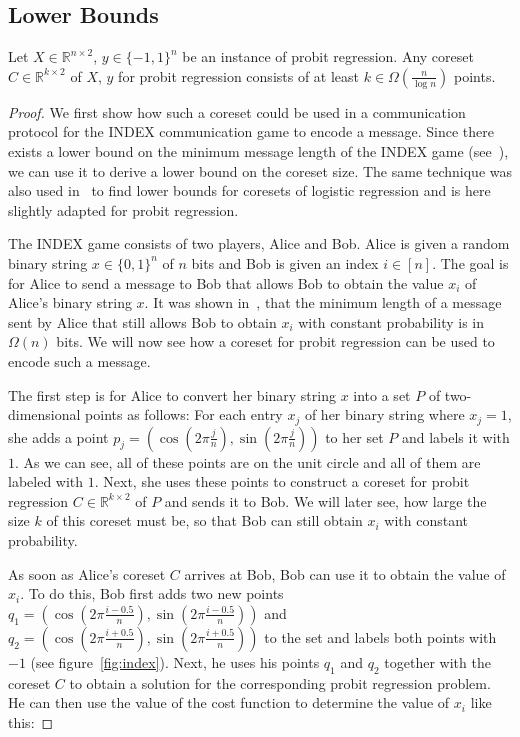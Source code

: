 \subsection{Lower Bounds}

\begin{theorem}
    Let $X \in \mathbb{R}^{n \times 2}$, $y \in \{-1, 1\}^n$ be
    an instance of probit regression.
    Any coreset $C \in \mathbb{R}^{k \times 2}$ of $X$, $y$
    for probit regression consists of
    at least $k \in \Omega\left(\frac{n}{\log{n}}\right)$ points.
\end{theorem}
\begin{proof}
    We first show how such a coreset could be used in a
    communication protocol for the INDEX communication game
    to encode a message.
    Since there exists a lower bound on the minimum
    message length of the INDEX game (see~\cite{index}),
    we can use it to derive a lower bound on the
    coreset size.
    The same technique was also used in~\cite{on-coresets} to find
    lower bounds for coresets of logistic regression and is here slightly
    adapted for probit regression.

    The INDEX game consists of two players, Alice and Bob.
    Alice is given a random binary string $x \in \{0, 1\}^n$ of $n$ bits
    and Bob is given an index $i \in [n]$.
    The goal is for Alice to send a message to Bob that allows
    Bob to obtain the value $x_i$ of Alice's binary string $x$.
    It was shown in~\cite{index}, that the minimum length of a message
    sent by Alice that still allows Bob to obtain $x_i$ with
    constant probability is in $\Omega(n)$ bits.
    We will now see how a coreset for probit regression can be used
    to encode such a message.

    The first step is for Alice to convert her binary string $x$ into
    a set $P$ of two-dimensional points as follows:
    For each entry $x_j$ of her binary string where $x_j = 1$, she adds
    a point $p_j = \left( \cos{\left(2 \pi \frac{j}{n}\right)},
        \sin{\left(2 \pi \frac{j}{n}\right)} \right)$
    to her set $P$ and labels it with $1$.
    As we can see, all of these points are on the unit circle and all
    of them are labeled with $1$.
    Next, she uses these points to construct a coreset for probit regression
    $C \in \mathbb{R}^{k \times 2}$ of $P$
    and sends it to Bob. We will later see, how
    large the size $k$ of this coreset must be, so that Bob can still
    obtain $x_i$ with constant probability.

    As soon as Alice's coreset $C$ arrives at Bob, Bob can use it to
    obtain the value of $x_i$.
    To do this, Bob first adds two new points
    $q_1 = \left( \cos{\left(2 \pi \frac{i - 0.5}{n}\right)},
        \sin{\left(2 \pi \frac{i - 0.5}{n}\right)} \right)$
    and
    $q_2 = \left( \cos{\left(2 \pi \frac{i + 0.5}{n}\right)},
        \sin{\left(2 \pi \frac{i + 0.5}{n}\right)} \right)$
    to the set and labels both points with $-1$ (see figure~\ref{fig:index}).
    Next, he uses his points $q_1$ and $q_2$ together with the coreset $C$ to
    obtain a solution for the corresponding probit regression problem.
    He can then use the value of the cost function to determine the value
    of $x_i$ like this:


\end{proof}

